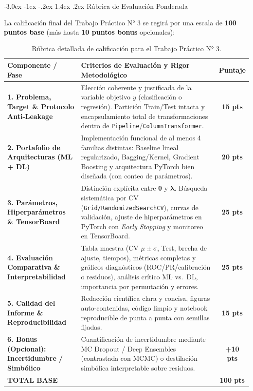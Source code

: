 \documentclass[11pt,a4paper]{article}
\makeatletter
\renewcommand\section{\@startsection{section}{1}{\z@}%
  {-3.0ex \@plus -1ex \@minus -.2ex}%
  {1.4ex \@plus .2ex}%
  {\color{NavyMain}\normalfont\Large\bfseries}}
\newcommand{\secrule}{\vspace{-0.55em}\noindent{\color{NavyMain}\rule{\textwidth}{0.6pt}}\par\vspace{0.45em}}
\makeatother
\begin{document}
\section{Rúbrica de Evaluación Ponderada}
\label{sec:rubrica}
\secrule

La calificación final del Trabajo Práctico N° 3 se regirá por una escala de \textbf{100 puntos base} (más hasta \textbf{10 puntos bonus} opcionales):

\begin{table}[ht!]
\centering\small
\renewcommand{\arraystretch}{1.15}
\begin{tabularx}{\textwidth}{>{\raggedright\arraybackslash}p{3.5cm} >{\raggedright\arraybackslash}X c}
\toprule
\textbf{Componente / Fase} & \textbf{Criterios de Evaluación y Rigor Metodológico} & \textbf{Puntaje} \\
\midrule
\textbf{1. Problema, Target \& Protocolo Anti-Leakage} &
Elección coherente y justificada de la variable objetivo $y$ (clasificación o regresión). Partición Train/Test intacta y encapsulamiento total de transformaciones dentro de \texttt{Pipeline}/\texttt{ColumnTransformer}. & \textbf{15 pts} \\
\midrule
\textbf{2. Portafolio de Arquitecturas (ML + DL)} &
Implementación funcional de al menos 4 familias distintas: Baseline lineal regularizado, Bagging/Kernel, Gradient Boosting y arquitectura PyTorch bien diseñada (con conteo de parámetros). & \textbf{20 pts} \\
\midrule
\textbf{3. Parámetros, Hiperparámetros \& TensorBoard} &
Distinción explícita entre $\bm{\theta}$ y $\bm{\lambda}$. Búsqueda sistemática por CV (\texttt{Grid/RandomizedSearchCV}), curvas de validación, ajuste de hiperparámetros en PyTorch con \textit{Early Stopping} y monitoreo en TensorBoard. & \textbf{25 pts} \\
\midrule
\textbf{4. Evaluación Comparativa \& Interpretabilidad} &
Tabla maestra (CV $\mu\pm\sigma$, Test, brecha de ajuste, tiempos), métricas completas y gráficos diagnósticos (ROC/PR/calibración o residuos), análisis crítico ML vs.\ DL, importancia por permutación y errores. & \textbf{25 pts} \\
\midrule
\textbf{5. Calidad del Informe \& Reproducibilidad} &
Redacción científica clara y concisa, figuras auto-contenidas, código limpio y notebook reproducible de punta a punta con semillas fijadas. & \textbf{15 pts} \\
\midrule
\textbf{6. Bonus (Opcional): Incertidumbre / Simbólico} &
Cuantificación de incertidumbre mediante MC Dropout / Deep Ensembles (contrastada con MCMC) o destilación simbólica interpretable sobre residuos. & \textbf{+10 pts} \\
\bottomrule
\textbf{TOTAL BASE} & & \textbf{100 pts} \\
\bottomrule
\end{tabularx}
\caption{Rúbrica detallada de calificación para el Trabajo Práctico N° 3.}
\label{tab:rubrica3}
\end{table}
\end{document}
